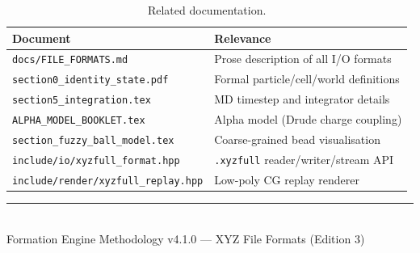 \documentclass[12pt, a4paper, oneside]{article}
\newcommand{\file}[1]{\texttt{#1}}
\begin{document}
\begin{table}[htbp]

  \centering

  \caption{Related documentation.}

  \label{tab:xrefs}

  \begin{tabular}{lp{8cm}}

    \toprule

    Document & Relevance \\

    \midrule

    \file{docs/FILE\_FORMATS.md}              & Prose description of all I/O formats \\

    \file{section0\_identity\_state.pdf}       & Formal particle/cell/world definitions \\

    \file{section5\_integration.tex}           & MD timestep and integrator details \\

    \file{ALPHA\_MODEL\_BOOKLET.tex}           & Alpha model (Drude charge coupling) \\

    \file{section\_fuzzy\_ball\_model.tex}     & Coarse-grained bead visualisation \\

    \file{include/io/xyzfull\_format.hpp}      & \texttt{.xyzfull} reader/writer/stream API \\

    \file{include/render/xyzfull\_replay.hpp}  & Low-poly CG replay renderer \\

    \bottomrule

  \end{tabular}

\end{table}


\vfill


\begin{center}

\rule{0.5\textwidth}{0.4pt}\\[6pt]

\small Formation Engine Methodology v4.1.0 --- XYZ File Formats (Edition 3)

\end{center}
\end{document}
